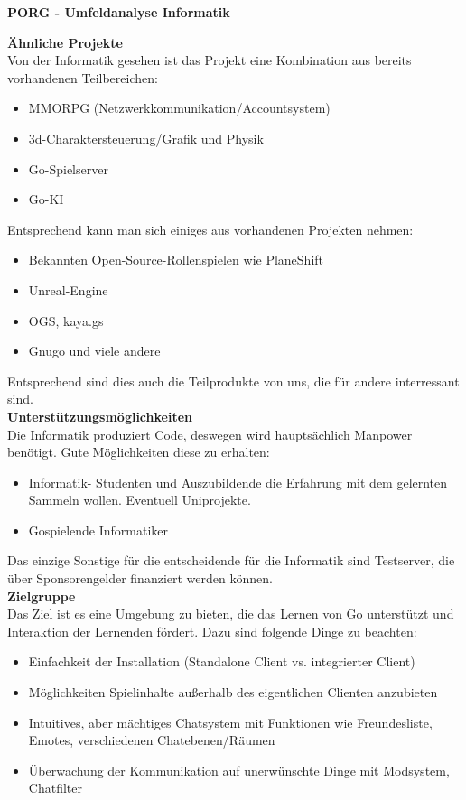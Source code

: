 \documentclass[11pt,a4paper]{article}
\begin{document}
\begin{center}
{\huge \bf PORG - Umfeldanalyse Informatik} \\
\end{center}
\bigskip
{\large \bf Ähnliche Projekte}
\smallskip \\
Von der Informatik gesehen ist das Projekt eine Kombination aus bereits vorhandenen Teilbereichen:
\begin{itemize}
\item MMORPG (Netzwerkkommunikation/Accountsystem)
\item 3d-Charaktersteuerung/Grafik und Physik
\item Go-Spielserver
\item Go-KI
\end{itemize}
Entsprechend kann man sich einiges aus vorhandenen Projekten nehmen:
\begin{itemize}
\item Bekannten Open-Source-Rollenspielen wie PlaneShift
\item Unreal-Engine
\item OGS, kaya.gs
\item Gnugo und viele andere
\end{itemize}
Entsprechend sind dies auch die Teilprodukte von uns, die für andere interressant sind.
\bigskip \\
{\large \bf Unterstützungsmöglichkeiten}
\smallskip \\
Die Informatik produziert Code, deswegen wird hauptsächlich Manpower benötigt. Gute Möglichkeiten diese zu erhalten:
\begin{itemize}
\item Informatik- Studenten und Auszubildende die Erfahrung mit dem gelernten Sammeln wollen. Eventuell Uniprojekte.
\item Gospielende Informatiker
\end{itemize}
Das einzige Sonstige für die entscheidende für die Informatik sind Testserver, die über Sponsorengelder finanziert werden können.
\bigskip \\
{\large \bf Zielgruppe}
\smallskip \\
Das Ziel ist es eine Umgebung zu bieten, die das Lernen von Go unterstützt und Interaktion der Lernenden fördert. Dazu sind folgende Dinge zu beachten:
\begin{itemize}
\item Einfachkeit der Installation (Standalone Client vs. integrierter Client)
\item Möglichkeiten Spielinhalte außerhalb des eigentlichen Clienten anzubieten
\item Intuitives, aber mächtiges Chatsystem mit Funktionen wie Freundesliste, Emotes, verschiedenen Chatebenen/Räumen
\item Überwachung der Kommunikation auf unerwünschte Dinge mit Modsystem, Chatfilter
\end{itemize}
\end{document}
